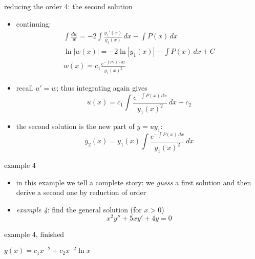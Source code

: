 \documentclass[dvipsnames]{beamer}
\begin{document}
\begin{frame}{reducing the order 4: the second solution}

\begin{itemize}
\item continuing:
\begin{gather*}
\int \frac{dw}{w} = - 2 \int \frac{y_1'(x)}{y_1(x)}\,dx - \int P(x)\,dx \\
\ln|w(x)| = - 2 \ln|y_1(x)| - \int P(x)\,dx + C \\
w(x) = c_1 \frac{e^{-\int P(x)\,dx}}{y_1(x)^2}
\end{gather*}
\item recall $u'=w$; thus integrating again gives
    $$u(x) = c_1 \int \frac{e^{-\int P(x)\,dx}}{y_1(x)^2}\,dx + c_2$$
\item the second solution is \alert{the new part of $y=uy_1$}:
    $$y_2(x) = y_1(x) \int \frac{e^{-\int P(x)\,dx}}{y_1(x)^2}\,dx$$
\end{itemize}
\end{frame}


\begin{frame}{example 4}

\begin{itemize}
\item in this example we tell a complete story: we \emph{guess} a first solution and then derive a second one by reduction of order
\item \emph{example 4}: find the general solution (for $x>0$)
    $$x^2 y'' + 5 x y' + 4 y = 0$$
\end{itemize}

\vspace{60mm}
\end{frame}


\begin{frame}{example 4, finished}

\vspace{60mm}

\hfill $y(x) = c_1 x^{-2} + c_2 x^{-2} \ln x$
\end{frame}
\end{document}
